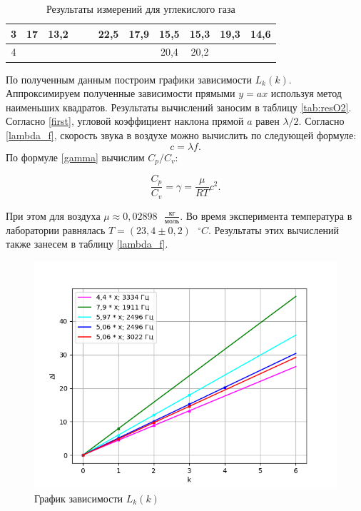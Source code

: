 \documentclass[12pt,a4paper]{article}
\begin{document}
\begin{table}[!h]
\begin{tabular}{|c|cc|cc|cc|cc|cc|}
3                           & \multicolumn{1}{c|}{17}    & 13,2                  & \multicolumn{1}{c|}{}      &                            & \multicolumn{1}{c|}{22,5}  & 17,9                       & \multicolumn{1}{c|}{15,5}  & 15,3                       & \multicolumn{1}{c|}{19,3}  & 14,6                       \\ \hline
4                           & \multicolumn{1}{c|}{}      & \multicolumn{1}{c|}{} & \multicolumn{1}{c|}{}      &                            & \multicolumn{1}{c|}{}      & \multicolumn{1}{c|}{}      & \multicolumn{1}{c|}{20,4}  & 20,2                       & \multicolumn{1}{c|}{}      & \multicolumn{1}{c|}{}      \\ \hline
\end{tabular}	
\caption{Результаты измерений для углекислого газа}
	\label{tab:oxy}
\end{table}



По полученным данным построим графики зависимости $ L_k(k) $.
Аппроксимируем полученные зависимости прямыми $ y=ax $ используя метод наименьших квадратов. Результаты вычислений заносим в таблицу \ref{tab:resO2}. Согласно \eqref{first}, угловой коэффициент наклона прямой $ a $ равен $ \lambda/2 $. Согласно \eqref{lambda_f}, скорость звука в воздухе можно вычислить по следующей формуле: 
\[ c = \lambda f. \]
По формуле \eqref{gamma} вычислим $ C_p/C_v $:

\[ \frac{C_p}{C_v} = \gamma = \frac{\mu}{RT}c^2. \]

При этом для воздуха $ \displaystyle \mu \approx 0,02898 \text{ } \frac{\text{кг}}{\text{моль}} $. Во время эксперимента температура в лаборатории равнялась $ T = (23,4 \pm 0,2) \text{ } ^\circ C $.
Результаты этих вычислений также занесем в таблицу \eqref{lambda_f}. 
 \begin{figure}[h!]
    \centering
    \includegraphics[scale=0.8]{plot2.png}
    \caption {График зависимости $ L_k(k) $}
\end{figure}
\end{document}
